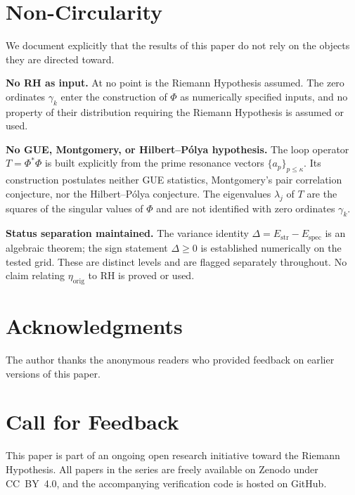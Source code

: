 \documentclass[11pt]{article}
\newcommand{\Estr}{E_{\mathrm{str}}}
\newcommand{\Espec}{E_{\mathrm{spec}}}
\newcommand{\etaorig}{\eta_{\mathrm{orig}}}
\begin{document}
\section{Non-Circularity}
\label{sec:nocirc}

We document explicitly that the results of this paper do not rely on
the objects they are directed toward.

\textbf{No RH as input.}
At no point is the Riemann Hypothesis assumed.
The zero ordinates $\gamma_k$ enter the construction of $\Phi$ as
numerically specified inputs, and no property of their distribution
requiring the Riemann Hypothesis is assumed or used.

\textbf{No GUE, Montgomery, or Hilbert--P\'olya hypothesis.}
The loop operator $T=\Phi^*\Phi$ is built explicitly from the prime
resonance vectors $\{a_p\}_{p\le\kappa}$. Its construction postulates
neither GUE statistics, Montgomery's pair correlation conjecture, nor
the Hilbert--P\'olya conjecture. The eigenvalues $\lambda_j$ of $T$ are
the squares of the singular values of $\Phi$ and are not identified
with zero ordinates $\gamma_k$.

\textbf{Status separation maintained.}
The variance identity $\Delta=\Estr-\Espec$ is an algebraic theorem;
the sign statement $\Delta\geq 0$ is established numerically on the
tested grid. These are distinct levels and are flagged separately
throughout. No claim relating $\etaorig$ to RH is proved or used.

\section*{Acknowledgments}

The author thanks the anonymous readers who provided feedback on
earlier versions of this paper.

\section*{Call for Feedback}

This paper is part of an ongoing open research initiative toward the
Riemann Hypothesis.
All papers in the series are freely available on Zenodo under CC~BY~4.0,
and the accompanying verification code is hosted on GitHub.
\end{document}
